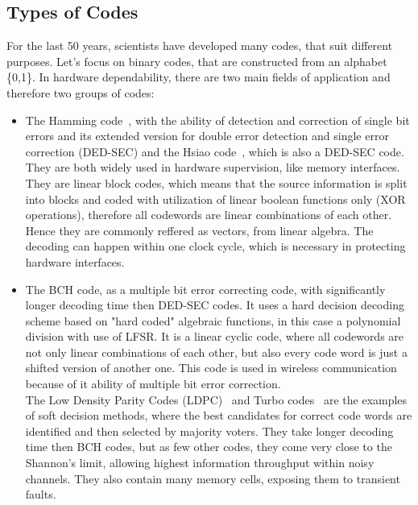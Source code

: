 \subsection{Types of Codes}
For the last 50 years, scientists have developed many codes, that suit different purposes. Let's focus on binary codes, that are constructed from an alphabet \{0,1\}. In hardware dependability, there are two main fields of application and therefore two groups of codes:
\begin{itemize}
\item The Hamming code~\cite{art:Hamming}, with the ability of detection and correction of single bit errors and its extended version for double error detection and single error correction (DED-SEC) and the Hsiao code~\cite{art:Hsiao}, which is also a DED-SEC code. They are both widely used in hardware supervision, like memory interfaces. They are linear block codes, which means that the source information is split into blocks and coded with utilization of linear boolean functions only (XOR operations), therefore all codewords are linear combinations of each other. Hence they are commonly reffered as vectors, from linear algebra. The decoding can happen within one clock cycle, which is necessary in protecting hardware interfaces.  
\item The BCH code, as a multiple bit error correcting code, with significantly longer decoding time then DED-SEC codes. It uses a hard decision decoding scheme based on "hard coded" algebraic functions, in this case a polynomial division with use of LFSR. It is a linear cyclic code, where all codewords are not only linear combinations of each other, but also every code word is just a shifted version of another one. This code is used in wireless communication because of it ability of multiple bit error correction.\\
The Low Density Parity Codes (LDPC)~\cite{art:LDPC} and Turbo codes~\cite{art:turbo} are the examples of soft decision methods, where the best candidates for correct code words are identified and then selected by majority voters. They take longer decoding time then BCH codes, but as few other codes, they come very close to the Shannon's limit, allowing highest information throughput within noisy channels. They also contain many memory cells, exposing them to transient faults.\\
\end{itemize}
